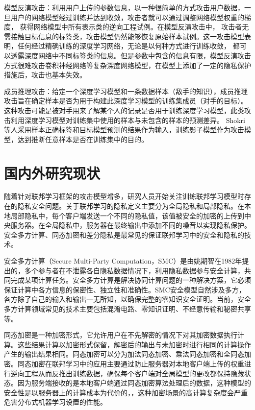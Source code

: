 模型反演攻击：利用用户上传的参数信息，以一种很简单的方式攻击用户数据，一旦用户的网络模型经过训练并达到收敛，攻击者就可以通过调整网络模型权重的梯度， 获得网络模型中所有表示类的逆向工程试例。在模型反演攻击中， 攻击者无需接触目标信息的标签类，攻击模型仍然能够恢复原始样本试例。这一攻击模型表明，任何经过精确训练的深度学习网络，无论是以何种方式进行训练收敛， 都可以透露深度网络中不同标签类的信息。但是参数中包含的信息有限，模型反演攻击方式很难攻击卷积神经网络等复杂深度网络模型，在模型上添加了一定的隐私保护措施后，攻击也基本失效。

成员推理攻击：给定一个深度学习模型和一条数据样本（敌手的知识），成员推理攻击旨在确定样本是否为用于构建此深度学习模型的训练集成员（对手的目标）。这种攻击可能是被对手用来了解某个人的记录是否用于训练深度学习模型，此类攻击利用深度学习模型对训练集中使用的样本与未包含的样本的预测差异。 Shokri 等人采用样本正确标签和目标模型预测的结果作为输入，训练影子模型作为攻击模型，达到推断任意样本是否在训练集中的目的。

\section{国内外研究现状}
随着针对联邦学习框架的攻击模型增多，研究人员开始关注训练联邦学习模型时存在的隐私安全问题。关于联邦学习的隐私定义主要分为全局隐私和局部隐私。在本地局部隐私中，每个客户端发送一个不同的隐私值，该值被安全的加密的上传到中央服务器。在全局隐私中，服务器在最终输出中添加不同的噪音以实现隐私保护。安全多方计算、同态加密和差分隐私是最常见的保证联邦学习中的安全和隐私的技术。

安全多方计算（Secure Multi-Party Computation，SMC）是由姚期智在1982年提出的，多个参与者在不泄露各自隐私数据情况下，利用隐私数据参与安全计算，共同完成某项计算任务。安全多方计算是解决协同计算问题的一种解决方案，它必须保证计算中各方信息的保密性、独立性和准确性。SMC安全模型自然涉及多方，各方除了自己的输入和输出一无所知，以确保完整的零知识安全证明。当前，安全多方计算领域常见的技术主要包括混淆电路、零知识证明、不经意传输和秘密共享等。

同态加密是一种加密形式，它允许用户在不先解密的情况下对其加密数据执行计算。这些结果计算以加密形式保留，解密后的输出与未加密时进行相同的计算操作产生的输出结果相同。同态加密可以分为加法同态加密、乘法同态加密和全同态加密。同态加密在联邦学习中的应用主要通过防止服务器对本地客户端上传的权重进行逆向工程从而反推出训练数据，确保每个客户端对全局模型的更改都保持隐藏状态。因为服务端接收的是本地客户端通过同态加密算法处理后的数据，这种模型的安全性是以服务器上的计算成本为代价的，，这种加密场景的高计算复杂度会严重危害分布式机器学习设置的性能。

